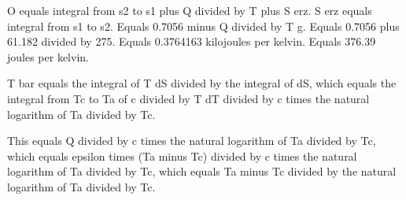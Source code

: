 O equals integral from s2 to s1 plus Q divided by T plus S erz.  
S erz equals integral from s1 to s2.  
Equals 0.7056 minus Q divided by T g.  
Equals 0.7056 plus 61.182 divided by 275.  
Equals 0.3764163 kilojoules per kelvin.  
Equals 376.39 joules per kelvin.

T bar equals the integral of T dS divided by the integral of dS, which equals the integral from Tc to Ta of c divided by T dT divided by c times the natural logarithm of Ta divided by Tc.  

This equals Q divided by c times the natural logarithm of Ta divided by Tc, which equals epsilon times (Ta minus Tc) divided by c times the natural logarithm of Ta divided by Tc, which equals Ta minus Tc divided by the natural logarithm of Ta divided by Tc.